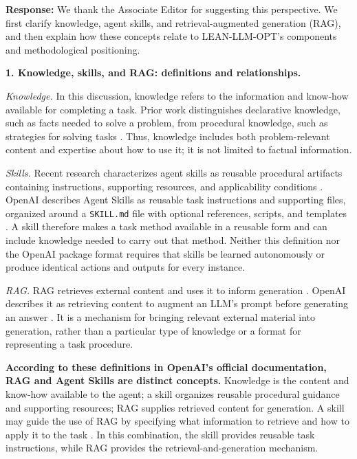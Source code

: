 \documentclass[11pt]{article}
\begin{document}
{\color{blue}
\noindent\textbf{Response:}
We thank the Associate Editor for suggesting this perspective.
We first clarify knowledge, agent skills, and retrieval-augmented
generation (RAG), and then explain how these concepts relate to
LEAN-LLM-OPT's components and methodological positioning.

\medskip
\noindent\textbf{1. Knowledge, skills, and RAG: definitions and relationships.}

\emph{Knowledge.} In this discussion, knowledge refers to the
information and know-how available for completing a task.
Prior work distinguishes declarative knowledge, such as facts
needed to solve a problem, from procedural knowledge, such as
strategies for solving tasks \citep{ae1_li2024metacognitive}.
Thus, knowledge includes both problem-relevant content and
expertise about how to use it; it is not limited to factual
information.

\emph{Skills.} Recent research characterizes agent skills as
reusable procedural artifacts containing instructions, supporting
resources, and applicability conditions
\citep{ae1_zhou2026skillsurvey}. OpenAI describes Agent Skills as
reusable task instructions and supporting files, organized around
a \texttt{SKILL.md} file with optional references, scripts, and
templates \citep{ae1_openai2026skills}. A skill therefore makes a
task method available in a reusable form and can include knowledge
needed to carry out that method. Neither this definition nor the
OpenAI package format requires that skills be learned autonomously
or produce identical actions and outputs for every instance.

\emph{RAG.} RAG retrieves external content and uses it to inform
generation \citep{ae1_lewis2020rag}. OpenAI describes it as
retrieving content to augment an LLM's prompt before generating
an answer \citep{ae1_openai2026accuracy}. It is a mechanism for
bringing relevant external material into generation, rather than
a particular type of knowledge or a format for representing a
task procedure.

\textbf{According to these definitions in OpenAI's official
 documentation, RAG and Agent Skills are distinct concepts.}
Knowledge is the content and know-how available to the agent;
a skill organizes reusable procedural guidance and supporting
resources; RAG supplies retrieved content for generation.
A skill may guide the use of RAG by specifying what information
to retrieve and how to apply it to the task
\citep{ae1_openai2026skilltools}. In this combination, the skill
provides reusable task instructions, while RAG provides the
retrieval-and-generation mechanism.

}
\end{document}
